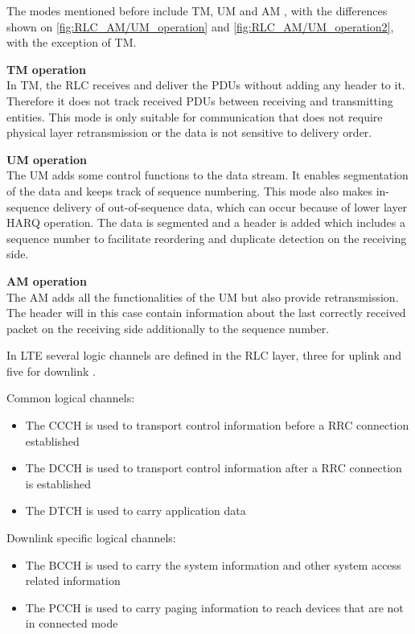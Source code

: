 The modes mentioned before include \gls{TM}, \gls{UM} and \gls{AM} \citep[ch. 6.4]{book_LTE_for_UMTS}, with the differences shown on \autoref{fig:RLC_AM/UM_operation} and \autoref{fig:RLC_AM/UM_operation2}, with the exception of TM.

\textbf{\gls{TM} operation} \\
In \gls{TM}, the \gls{RLC} receives and deliver the \gls{PDU}s without adding any header to it. Therefore it does not track received \gls{PDU}s between receiving and transmitting entities. This mode is only suitable for communication that does not require physical layer retransmission or the data is not sensitive to delivery order.

\textbf{\gls{UM} operation} \\
The \gls{UM} adds some control functions to the data stream. It enables segmentation of the data and keeps track of sequence numbering. This mode also makes in-sequence delivery of out-of-sequence data, which can occur because of lower layer \gls{HARQ} operation. The data is segmented and a header is added which includes a sequence number to facilitate reordering and duplicate detection on the receiving side.

\textbf{\gls{AM} operation} \\
The \gls{AM} adds all the functionalities of the \gls{UM} but also provide retransmission. The header will in this case contain information about the last correctly received packet on the receiving side additionally to the sequence number. 

In \gls{LTE} several logic channels are defined in the \gls{RLC} layer, three for uplink and five for downlink \citep[ch. 6.3]{book_LTE_for_UMTS}. 

Common logical channels:
\begin{itemize}
\item The \gls{CCCH} is used to transport control information before a \gls{RRC} connection established
\item The \gls{DCCH} is used to transport control information after a \gls{RRC} connection is established
\item The \gls{DTCH} is used to carry application data
\end{itemize}
Downlink specific logical channels:
\begin{itemize}
\item The \gls{BCCH} is used to carry the system information and other system access related information
\item The \gls{PCCH} is used to carry paging information to reach devices that are not in connected mode
\end{itemize}


